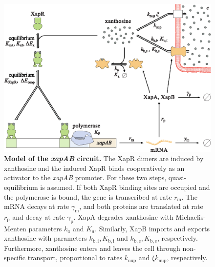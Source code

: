 \documentclass[10pt,letterpaper]{article}
\newcommand{\n}[1]{\mathrm{#1}}
\begin{document}
\begin{figure}[h!]
	\centering
	\includegraphics{media/XapSystem.eps}
	\caption{{\bf Model of the \emph{xapAB} circuit.}
		The XapR dimers are induced by xanthosine and the induced XapR binds
		cooperatively as an activator to the \emph{xapAB} promoter. For
		these two steps, quasi-equilibrium is assumed. If both XapR binding
		sites are occupied and the polymerase is bound, the gene is
		transcribed at rate $r_{\n{m}}$. The mRNA decays at rate
		$\gamma_{\n{m}}$, and both proteins are translated at rate
		$r_{\n{p}}$ and decay at rate $\gamma_{\n{p}}$. XapA degrades
		xanthosine with Michaelis-Menten parameters $k_{a}$ and $K_a$.
		Similarly, XapB imports and exports xanthosine with parameters
		$k_{\n{b,i}}, K_{\n{b,i}}$ and $k_{\n{b,e}}, K_{\n{b,e}}$,
		respectively. Furthermore, xanthosine enters and leaves the cell
		through non-specific transport, proportional to rates $k_{\n{nup}}$ and $\xi
		k_{\n{nup}}$, respectively.}
	\label{fig2:model}
\end{figure}
\end{document}
